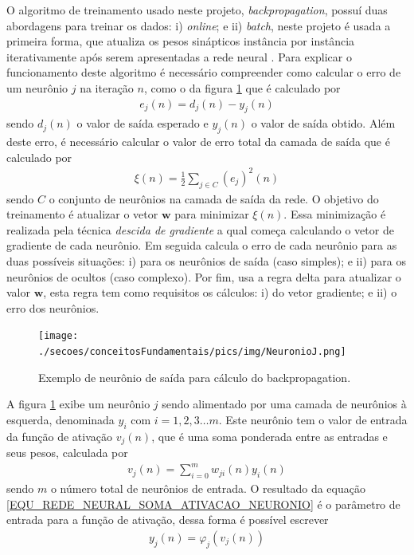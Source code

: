 O algoritmo de treinamento usado neste projeto, \emph{backpropagation}, possuí duas abordagens para treinar os dados: i) \emph{online}; e ii) \emph{batch}, neste projeto é usada a primeira forma, que atualiza os pesos sinápticos instância por instância iterativamente após serem apresentadas a rede neural \cite{Haykin2007}. Para explicar o funcionamento deste algoritmo é necessário compreender como calcular o erro de um neurônio \(j\) na iteração \(n\), como o da figura \ref{FIGURA_REDE_NEURAL_NEURONIO_BACKPROPAGATION} que é calculado por
\begin{align}
e_{j}(n) = d_{j}(n) - y_{j}(n)	\label{EQU_REDE_NEURAL_ERRO_NEURONIO_J}
\end{align}
sendo \(d_{j}(n)\) o valor de saída esperado e \(y_{j}(n)\) o valor de saída obtido. Além deste erro, é necessário calcular o valor de erro total da camada de saída que é calculado por
\begin{align}
\xi(n) = \frac{1}{2} \sum\limits_{j \in C} (e_{j})^{2}(n)	\label{EQU_REDE_NEURAL_ERRO_TODOS_OS_NEURONIOS_SAIDA}
\end{align}
sendo \(C\) o conjunto de neurônios na camada de saída da rede. O objetivo do treinamento é atualizar o vetor \(\mathbf{w}\) para minimizar \(\xi(n)\). Essa minimização é realizada pela técnica \emph{descida de gradiente} a qual começa calculando o vetor de gradiente de cada neurônio. Em seguida calcula o erro de cada neurônio para as duas possíveis situações: i) para os neurônios de saída (caso simples); e ii) para os neurônios de ocultos (caso complexo). Por fim, usa a regra delta para atualizar o valor \(\mathbf{w}\), esta regra tem como requisitos os cálculos: i) do vetor gradiente; e ii) o erro dos neurônios.
\begin{figure}[hbt]
	\centering
 	  \caption{Exemplo de neurônio de saída para cálculo do backpropagation.}
		\texttt{[image: ./secoes/conceitosFundamentais/pics/img/NeuronioJ.png]}
	\label{FIGURA_REDE_NEURAL_NEURONIO_BACKPROPAGATION}
\end{figure}
A figura \ref{FIGURA_REDE_NEURAL_NEURONIO_BACKPROPAGATION} exibe um neurônio \(j\) sendo alimentado por uma camada de neurônios à esquerda, denominada \(y_{i}\) com \(i = 1, 2, 3 \ldots m\). Este neurônio tem o valor de entrada da função de ativação \(v_{j}(n)\), que é uma soma ponderada entre as entradas e seus pesos, calculada por
\begin{align}
v_{j}(n) = \sum\limits_{i = 0}^{m} w_{ji}(n)y_{i}(n)\label{EQU_REDE_NEURAL_SOMA_ATIVACAO_NEURONIO}
\end{align}
sendo \(m\) o número total de neurônios de entrada. O resultado da equação \eqref{EQU_REDE_NEURAL_SOMA_ATIVACAO_NEURONIO} é o parâmetro de entrada para a função de ativação, dessa forma é possível escrever
\begin{align}
y_{j}(n) = \varphi_{j}(v_{j}(n)) \label{EQU_REDE_NEURAL_SAIDA_NEURONIO}
\end{align}


